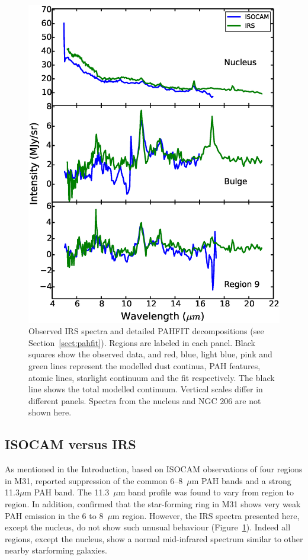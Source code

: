 \documentclass[useAMS,usenatbib,a4paper]{mn2e}
\begin{document}
\begin{figure}
\centering
\includegraphics[scale=0.45]{./fig6.eps}
 \caption{Observed IRS spectra and detailed PAHFIT decompositions (see Section~\ref{sect:pahfit}). Regions are labeled in each panel.
Black squares show the observed data, and red, blue, light blue, pink and green lines represent the modelled
dust continua, PAH features, atomic lines, starlight continuum and the fit respectively. The black line shows the total modelled continuum. 
Vertical scales differ in different panels. Spectra from the nucleus and NGC 206 are not shown here.
}
\label{PAHFITplots}
\end{figure}


\subsection{ISOCAM versus IRS}
\label{sect:iso_vs_irs}

As mentioned in the Introduction, based on ISOCAM observations of four regions in M31, \citet{1998Cesarsky} reported 
suppression of the common 6--8~$\mu$m PAH bands and a strong 11.3$\mu$m PAH band.
The 11.3~$\mu$m band profile was found to vary from region to region.  
In addition, \citet{Pagani_1999} confirmed that the star-forming ring in M31 shows very weak PAH emission in the 6 to 8~$\mu$m region. 
However, the IRS spectra presented here, except the nucleus, do not show such unusual behaviour (Figure~\ref{PAHFITplots}). 
Indeed all regions, except the nucleus, show a normal mid-infrared spectrum similar to other nearby starforming galaxies. 
\end{document}
